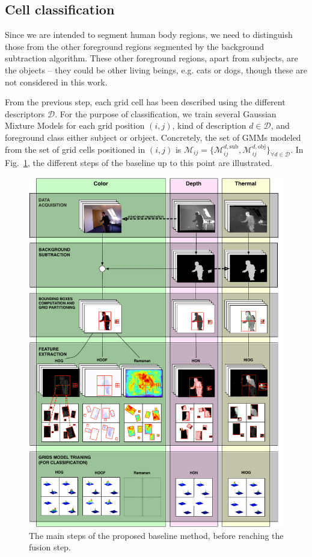 \documentclass[10pt,twocolumn,letterpaper]{article}
\begin{document}
\subsection{Cell classification}
Since we are intended to segment human body regions, we need to distinguish those from the other foreground regions segmented by the background subtraction algorithm. These other foreground regions, apart from subjects, are the objects -- they could be other living beings, e.g. cats or dogs, though these are not considered in this work.

From the previous step, each grid cell has been described using the different descriptors $\mathcal{D}$. For the purpose of classification, we train several Gaussian Mixture Models for each grid position $(i,j)$, kind of description $d \in \mathcal{D}$, and foreground class either subject or orbject. Concretely, the set of GMMs modeled from the set of grid cells positioned in $(i,j)$ is $\mathcal{M}_{ij} = \{\mathcal{M}_{ij}^{d,\mathrm{sub}},\mathcal{M}_{ij}^{d,\mathrm{obj}}\}_{\forall d \in \mathcal{D}}$. In Fig.~\ref{fig:baseline}, the different steps of the baseline up to this point are illustrated.

\begin{figure}[ht!]
	\centering
	\includegraphics[width=\linewidth]{pictures/diagram.png}
	\caption{The main steps of the proposed baseline method, before reaching the fusion step.}
	\label{fig:baseline}
\end{figure}
\end{document}
